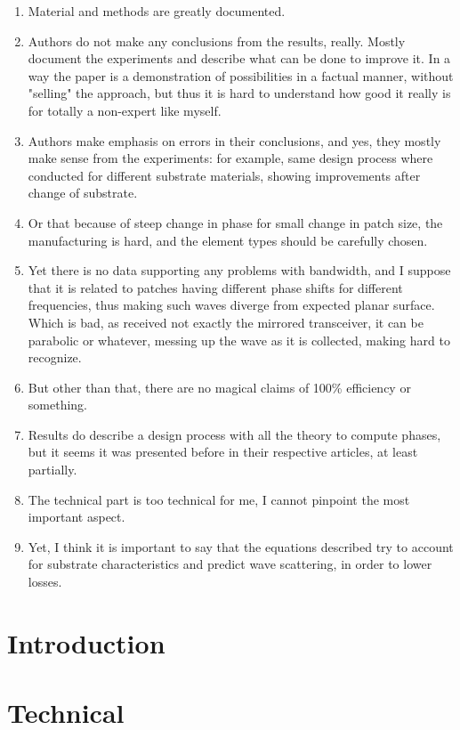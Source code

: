 \documentclass{article}
\begin{document}
\begin{enumerate}
        \item Material and methods are greatly documented.
        \item Authors do not make any conclusions from the results, really. Mostly document the experiments and describe what can be done to improve it. In a way the paper is a demonstration of possibilities in a factual manner, without "selling" the approach, but thus it is hard to understand how good it really is for totally a non-expert like myself.
        \item Authors make emphasis on errors in their conclusions, and yes, they mostly make sense from the experiments: for example, same design process where conducted for different substrate materials, showing improvements after change of substrate.
        \item Or that because of steep change in phase for small change in patch size, the manufacturing is hard, and the element types should be carefully chosen.
        \item Yet there is no data supporting any problems with bandwidth, and I suppose that it is related to patches having different phase shifts for different frequencies, thus making such waves diverge from expected planar surface. Which is bad, as received not exactly the mirrored transceiver, it can be parabolic or whatever, messing up the wave as it is collected, making hard to recognize.
        \item But other than that, there are no magical claims of 100\% efficiency or something.
        \item Results do describe a design process with all the theory to compute phases, but it seems it was presented before in their respective articles, at least partially.
        \item The technical part is too technical for me, I cannot pinpoint the most important aspect.
        \item Yet, I think it is important to say that the equations described try to account for substrate characteristics and predict wave scattering, in order to lower losses.
    \end{enumerate}

    \section{Introduction}\label{sec:introduction}
    \section{Technical}\label{sec:technical}
\end{document}
